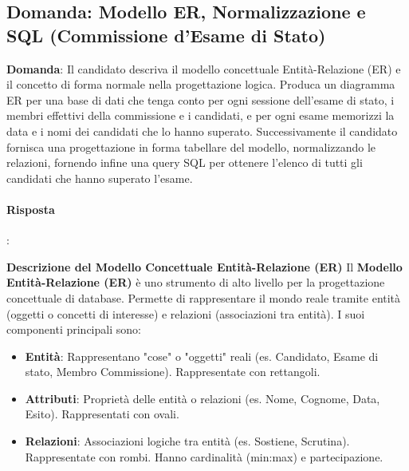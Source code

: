 
\subsection*{Domanda: Modello ER, Normalizzazione e SQL (Commissione d'Esame di Stato)}

\textbf{Domanda}: Il candidato descriva il modello concettuale Entità-Relazione (ER) e il concetto di forma normale nella progettazione logica. Produca un diagramma ER per una base di dati che tenga conto per ogni sessione dell’esame di stato, i membri effettivi della commissione e i candidati, e per ogni esame memorizzi la data e i nomi dei candidati che lo hanno superato. Successivamente il candidato fornisca una progettazione in forma tabellare del modello, normalizzando le relazioni, fornendo infine una query SQL per ottenere l’elenco di tutti gli candidati che hanno superato l’esame.

\paragraph{Risposta}:

\textbf{Descrizione del Modello Concettuale Entità-Relazione (ER)}
Il \textbf{Modello Entità-Relazione (ER)} è uno strumento di alto livello per la progettazione concettuale di database. Permette di rappresentare il mondo reale tramite entità (oggetti o concetti di interesse) e relazioni (associazioni tra entità). I suoi componenti principali sono:
\begin{itemize}
    \item \textbf{Entità}: Rappresentano "cose" o "oggetti" reali (es. Candidato, Esame di stato, Membro Commissione). Rappresentate con rettangoli.
    \item \textbf{Attributi}: Proprietà delle entità o relazioni (es. Nome, Cognome, Data, Esito). Rappresentati con ovali.
    \item \textbf{Relazioni}: Associazioni logiche tra entità (es. Sostiene, Scrutina). Rappresentate con rombi. Hanno cardinalità (min:max) e partecipazione.
\end{itemize}

